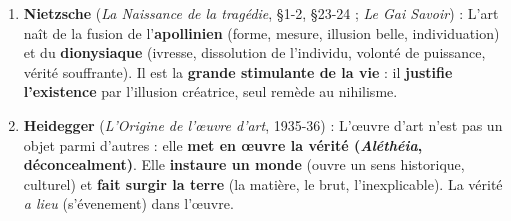 \documentclass[11pt]{article}
\begin{document}
\begin{corrige}
\begin{enumerate}
\item \textbf{Nietzsche} (\emph{La Naissance de la tragédie}, §1-2, §23-24 ; \emph{Le Gai Savoir}) : \guillemotleft L'art naît de la fusion de l'\textbf{apollinien} (forme, mesure, illusion belle, individuation) et du \textbf{dionysiaque} (ivresse, dissolution de l'individu, volonté de puissance, vérité souffrante). Il est la \textbf{grande stimulante de la vie} : il \textbf{justifie l'existence} par l'illusion créatrice, seul remède au nihilisme. \guillemotright
\item \textbf{Heidegger} (\emph{L'Origine de l'œuvre d'art}, 1935-36) : \guillemotleft L'œuvre d'art n'est pas un objet parmi d'autres : elle \textbf{met en œuvre la vérité (\emph{Aléthéia}, déconcealment)}. Elle \textbf{instaure un monde} (ouvre un sens historique, culturel) et \textbf{fait surgir la terre} (la matière, le brut, l'inexplicable). La vérité \emph{a lieu} (s'évenement) dans l'œuvre. \guillemotright
\end{enumerate}
\end{corrige}
\end{document}
